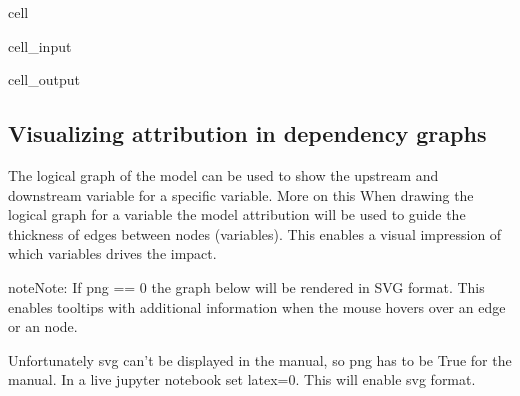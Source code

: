 \documentclass[letterpaper,10pt,english]{jupyterBook}
\begin{document}
\begin{sphinxuseclass}{cell}\begin{sphinxVerbatimInput}

\begin{sphinxuseclass}{cell_input}
\begin{sphinxVerbatim}[commandchars=\\\{\}]
   
\end{sphinxVerbatim}

\end{sphinxuseclass}\end{sphinxVerbatimInput}
\begin{sphinxVerbatimOutput}

\begin{sphinxuseclass}{cell_output}
\noindent{}

\end{sphinxuseclass}\end{sphinxVerbatimOutput}

\end{sphinxuseclass}

\subsection{Visualizing attribution in dependency graphs}
\label{\detokenize{content/06_ModelAnalytics/Attribution:visualizing-attribution-in-dependency-graphs}}
\sphinxAtStartPar
The logical graph of the model can be used to show the upstream and downstream variable for a specific variable. More on this 
When drawing the logical graph for a variable the model attribution will be used to guide the thickness of edges between nodes (variables). This enables a visual impression of which
variables drives the impact.

\begin{sphinxadmonition}{note}{Note:}
\sphinxAtStartPar
If png == 0 the graph below will be rendered in SVG format. This enables tooltips with additional information when the mouse hovers
over an edge or an node.

\sphinxAtStartPar
Unfortunately svg can’t be displayed in the manual, so png has to be True for the manual. In a live jupyter notebook set latex=0. This will
enable svg format.
\end{sphinxadmonition}
\end{document}
